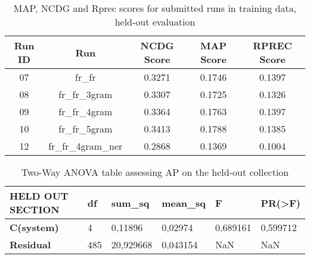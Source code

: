 \begin{table}[h!]
    \begin{center}
        \caption{MAP, NCDG and Rprec scores for submitted runs in training data, held-out evaluation}
        \label{tab:ho_scores}
        \begin{tabular}{|c|c||c|c|c|}
            \hline
            \textbf{Run ID} & \textbf{Run} & \textbf{NCDG Score} & \textbf{MAP Score} & \textbf{RPREC Score}\\
            \hline\hline
            07 & fr\_fr & 0.3271 & 0.1746 & 0.1397 \\
            \hline
            08 & fr\_fr\_3gram & 0.3307 & 0.1725 & 0.1326 \\
            \hline
            09 & fr\_fr\_4gram & 0.3364 & 0.1763 & 0.1397 \\
            \hline
            10 & fr\_fr\_5gram & 0.3413 & 0.1788 & 0.1385 \\
            \hline
            12 & fr\_fr\_4gram\_ner & 0.2868 & 0.1369 & 0.1004 \\
            \hline
        \end{tabular}
    \end{center}
\end{table}

\begin{table}[h!]
    \centering
    \caption{Two-Way ANOVA table assessing AP on the held-out collection}
    \label{tab:ho_anova}
    \begin{tabular}{|l|l|l|l|l|l|}
    \hline
        \textbf{HELD OUT SECTION} & \textbf{df} & \textbf{sum\_sq} & \textbf{mean\_sq} & \textbf{F} & \textbf{PR(>F)} \\ \hline\hline
        \textbf{C(system)} & 4 & 0,11896 & 0,02974 & 0,689161 & 0,599712 \\ \hline
        \textbf{Residual} & 485 & 20,929668 & 0,043154 & NaN & NaN \\ \hline
    \end{tabular}
\end{table}


